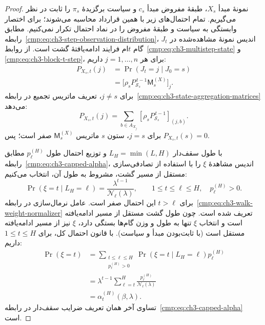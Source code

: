 \begin{proof}
نمونهٔ مبدأ $X_s$، طبقهٔ مفروض مبدأ $c_s$ و سیاست برگزیدهٔ
$\pi_s$ را ثابت در نظر می‌گیریم. تمام احتمال‌های زیر با همین
قرارداد محاسبه می‌شوند؛ برای اختصار وابستگی به سیاست و
طبقهٔ مفروض را در نماد احتمال تکرار نمی‌کنیم.
مطابق رابطه~\eqref{cmp:eq:ch3-step-observation-distribution}،
$J_t$ اندیس نمونهٔ مشاهده‌شده در گام $t$ام فرایند ادامه‌یافتهٔ گشت است.
از روابط~\eqref{cmp:eq:ch3-multistep-state} و
\eqref{cmp:eq:ch3-block-t-step}، برای هر $j=1,\ldots,n$ داریم:
\begin{equation}\label{eq:app-ch3-observed-sample-marginal}
\begin{aligned}
P_{X_s,t}(j)
&=\Pr(J_t=j\mid J_0=s)\\
&=\bigl[\rho_s P_{\mathcal S_s}^{\,t-1}
\mathsf M_s^{(X)}\bigr]_j.
\end{aligned}
\end{equation}
برای $j\ne s$، تعریف ماتریس تجمیع در
رابطه~\eqref{cmp:eq:ch3-state-aggregation-matrices} می‌دهد:
\[
P_{X_s,t}(j)=
\sum_{b\in A_{X_j}}
[\rho_sP_{\mathcal S_s}^{\,t-1}]_{(j,b)}.
\]
برای $j=s$، ستون $s$ ماتریس $\mathsf M_s^{(X)}$ صفر است؛
پس $P_{X_s,t}(s)=0$.

با طول سقف‌دار $L_H=\min(L,H)$ و توزیع احتمال طول
$p_\ell^{(H)}$ مطابق رابطه~\eqref{cmp:eq:ch3-capped-alpha}،
اندیس مشاهدهٔ $\xi$ را با استفاده از تصادفی‌سازی مستقل از مسیر
گشت، مشروط به طول آن، انتخاب می‌کنیم:
\begin{equation}\label{eq:app-ch3-conditional-observation-step}
\Pr(\xi=t\mid L_H=\ell)
=\frac{\lambda^{t-1}}{\mathcal N_\ell(\lambda)},
\qquad 1\le t\le\ell\le H,\quad p_\ell^{(H)}>0.
\end{equation}
برای $t>\ell$ این احتمال صفر است. عامل نرمال‌سازی در
رابطه~\eqref{cmp:eq:ch3-walk-weight-normalizer} تعریف شده است.
چون طول گشت مستقل از مسیر ادامه‌یافته است و انتخاب $\xi$
تنها به طول و وزن گام‌ها بستگی دارد، $\xi$ نیز از مسیر
ادامه‌یافته مستقل است (با ثابت‌بودن مبدأ و سیاست).
با قانون احتمال کل، برای $1\le t\le H$ داریم:
\begin{equation}\label{eq:app-ch3-marginal-observation-step}
\begin{aligned}
\Pr(\xi=t)
&=\sum_{\substack{t\le\ell\le H\\p_\ell^{(H)}>0}}
\Pr(\xi=t\mid L_H=\ell)p_\ell^{(H)}\\
&=\lambda^{t-1}\sum_{\ell=t}^{H}
\frac{p_\ell^{(H)}}{\mathcal N_\ell(\lambda)}\\
&=\alpha_t^{(H)}(\beta,\lambda).
\end{aligned}
\end{equation}
تساوی آخر همان تعریف ضرایب سقف‌دار در
رابطه~\eqref{cmp:eq:ch3-capped-alpha} است.


\end{proof}
